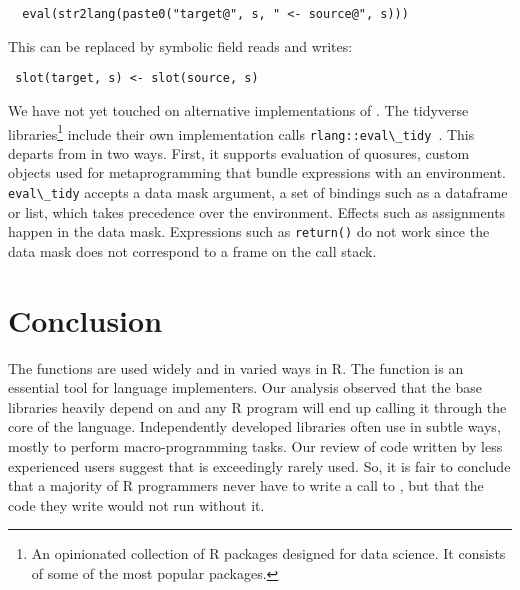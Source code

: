 \documentclass[acmsmall, screen]{acmart}
\renewcommand{\k}[1]{\lstinline |#1|\xspace}
\begin{document}
\begin{lstlisting}
  eval(str2lang(paste0("target@", s, " <- source@", s)))
\end{lstlisting}


This can be replaced by symbolic field reads and writes:

\begin{lstlisting}
 slot(target, s) <- slot(source, s)
\end{lstlisting}



We have not yet touched on alternative implementations of \eval. The tidyverse
libraries\footnote{An opinionated collection of R packages designed for data
science. It consists of some of the most popular packages.} include their own
implementation calls \k{rlang::eval\_tidy}~\cite{tidyverse}. This departs from
\eval in two ways. First, it supports evaluation of quosures, custom objects
used for metaprogramming that bundle expressions with an environment.
\k{eval\_tidy} accepts a data mask argument, a set of bindings such as a
dataframe or list, which takes precedence over the environment. Effects such as
assignments happen in the data mask. Expressions such as \k{return()} do not
work since the data mask does not correspond to a frame on the call stack.

\section{Conclusion}

The \eval functions are used widely and in varied ways in R. The function is an
essential tool for language implementers. Our analysis observed that the base
libraries heavily depend on \eval and any R program will end up calling it
through the core of the language. Independently developed libraries often use
\eval in subtle ways, mostly to perform macro-programming tasks. Our review of
code written by less experienced users suggest that \eval is exceedingly rarely
used. So, it is fair to conclude that a majority of R programmers never have to
write a call to \eval, but that the code they write would not run without it.
\end{document}
